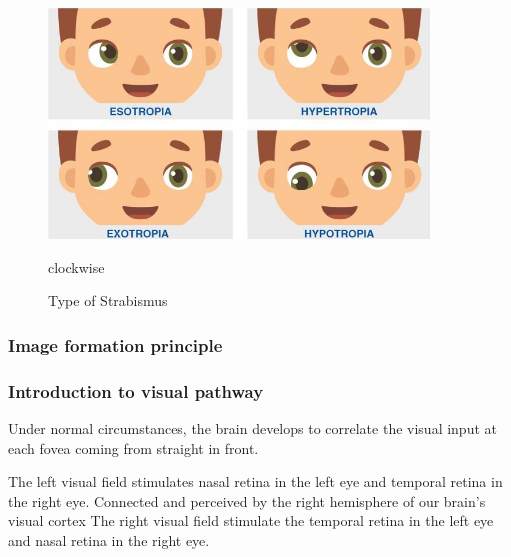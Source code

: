 \documentclass[12pt]{article}
\begin{document}
\begin{figure}[h!]
\centering
\includegraphics[width =0.9\textwidth]{Images/stranismus.png}
\caption{Type of Strabismus} \label{figure:strabismus_type}
\raggedright
\footnotesize
clockwise

\end{figure}
    \subsubsection{Image formation principle}

    \subsubsection{Introduction to visual pathway}
    

Under normal circumstances, the brain develops to correlate the visual input at each fovea coming from straight in front. 

The left visual field stimulates nasal retina in the left eye and temporal retina in the right eye. Connected and perceived by the right hemisphere of our brain's visual cortex 
The right visual field stimulate the temporal retina in the left eye and nasal retina in the right eye. 
\end{document}
